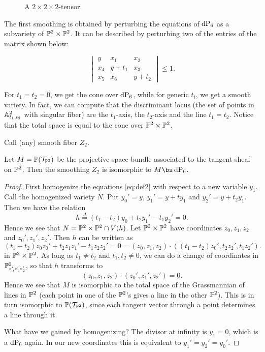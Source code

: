 \begin{figure}[b]
\centering

\caption{A $2 \times 2 \times 2$-tensor.}
\label{fig:p1p1p1_equations}
\end{figure}

The first smoothing is obtained by perturbing the equations of $\dP6$ as a subvariety of $\P^2 \times \P^2$.  It can be described by perturbing two of the entries of the matrix shown below:

\begin{equation}
\label{eq:def2}
\begin{vmatrix}
y & x_1 & x_2 \\
x_4 & y+t_1 & x_3 \\
x_5 & x_6 & y+t_2
\end{vmatrix} \leq 1.
\end{equation}


For $t_1=t_2=0$, we get the cone over $\dP6$, while for generic $t_i$, we get a smooth variety. In fact, we can compute that the discriminant locus (the set of points in $\A^2_{t_1,t_2}$ with singular fiber) are the $t_1$-axis, the $t_2$-axis and the line $t_1=t_2$. Notice that the total space is equal to the cone over $\P^2 \times \P^2$.

Call (any) smooth fiber $Z_2$. 

\begin{lemma}
Let $M=\P(\mathcal T_ {\P^2})$ be the projective space bundle associated to the tangent sheaf on $\P^2$. Then the smoothing $Z_2$ is isomorphic to $M \bs \dP6$. 
\end{lemma}
\begin{proof}
First homogenize the equations \eqref{eq:def2} with respect to a new variable $y_1$. Call the homogenized variety $N$. Put $y_0'=y$, $y_1' = y+ty_1$ and $y_2'=y+t_2y_1$. Then we have the relation
\[
h \stackrel{\Delta}= (t_1-t_2)y_0 +t_2 y_1' - t_1 y_2' = 0.
\]
Hence we see that $N=\P^2 \times \P^2 \cap V(h)$. Let $\P^2 \times \P^2$ have coordinates $z_0,z_1,z_2$ and $z_0',z_1',z_2'$. Then $h$ can be written as 
\[
(t_1-t_2) z_0z_0' + t_ 2 z_1 z_1' - t_1 z_2 z_2' = 0 = (z_0,z_1,z_2) \cdot \left( \left(t_1-t_2\right) z_0', t_2 z_2', t_1 z_2' \right).
\]
in $\P^2 \times \P^2$. As long as $t_1 \neq t_2$ and $t_1,t_2 \neq 0$, we can do a change of coordinates in $\P^2_{z_0'z_1'z_2'}$, so that $h$ transforms to
\[
(z_0,z_1,z_2) \cdot (z_0',z_1',z_2') = 0.
\]
Hence we see that $M$ is isomorphic to the total space of the Grassmannian of lines in $\P^2$ (each point in one of the $\P^2$'s gives a line in the other $\P^2$). This is in turn isomorphic to $\P(\mathcal T_{\P^2})$, since each tangent vector through a point determines a line through it.

What have we gained by homogenizing? The divisor at infinity is $y_1=0$, which is a $\dP6$ again. In our new coordinates this is equivalent to $y_1'=y_2'=y_0'$.
\end{proof}

